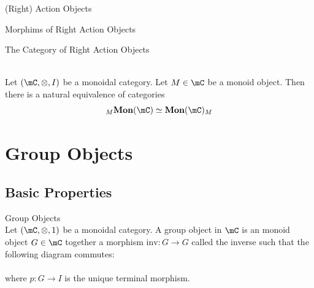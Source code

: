 \documentclass[a4paper]{article}
\begin{document}
\begin{defn}{(Right) Action Objects}{}
\end{defn}

\begin{defn}{Morphims of Right Action Objects}{}\\
\end{defn}

\begin{defn}{The Category of Right Action Objects}{}
\end{defn}

\begin{prp}{}{}\\
Let $(\mC,\otimes,I)$ be a monoidal category. Let $M\in\mC$ be a monoid object. Then there is a natural equivalence of categories $${_M}\bold{Mon}(\mC)\simeq\bold{Mon}(\mC)_M$$
\end{prp}

\pagebreak
\section{Group Objects}
\subsection{Basic Properties}
\begin{defn}{Group Objects}{}\\
Let $(\mC,\otimes,1)$ be a monoidal category. A group object in $\mC$ is an monoid object $G\in\mC$ together a morphism $\text{inv}:G\to G$ called the inverse such that the following diagram commutes: \\
\\
where $p:G\to I$ is the unique terminal morphism. 
\end{defn}
\end{document}
